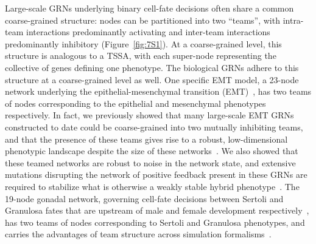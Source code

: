 \documentclass[11pt]{article}
\begin{document}
Large-scale GRNs underlying binary cell-fate decisions often share a common coarse-grained structure: nodes can be partitioned into two ``teams'', with intra-team interactions predominantly activating and inter-team interactions predominantly inhibitory (Figure~\ref{fig:7S1}). At a coarse-grained level, this structure is analogous to a TSSA, with each super-node representing the collective of genes defining one phenotype. The biological GRNs adhere to this structure at a coarse-grained level as well. One specific EMT model, a 23-node network underlying the epithelial-mesenchymal transition (EMT)~\cite{Huang2017}, has two teams of nodes corresponding to the epithelial and mesenchymal phenotypes respectively. In fact, we previously showed that many large-scale EMT GRNs constructed to date could be coarse-grained into two mutually inhibiting teams, and that the presence of these teams gives rise to a robust, low-dimensional phenotypic landscape despite the size of these networks~\cite{hari2022landscape,tripathi2023minimal,hari2023low}. We also showed that these teamed networks are robust to noise in the network state, and extensive mutations disrupting the network of positive feedback present in these GRNs are required to stabilize what is otherwise a weakly stable hybrid phenotype~\cite{rashid2022network, Hari2025APlasticity}. The 19-node gonadal network, governing cell-fate decisions between Sertoli and Granulosa fates that are upstream of male and female development respectively~\cite{rios2015boolean}, has two teams of nodes corresponding to Sertoli and Granulosa phenotypes, and carries the advantages of team structure across simulation formalisms~\cite{Hari2025LowNetworks, Shyam2025MutuallyNetworks}.
\end{document}
